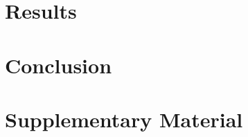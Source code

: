 \documentclass{article} %
\begin{document}
\section{Results}\label{sec:results}



\section{Conclusion}\label{sec:conclusion}






\clearpage
\appendix
\section*{Supplementary Material}

\end{document}
